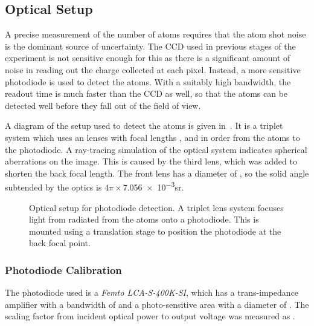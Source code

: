 \subsection{Optical Setup}\label{subsec:optical_setup}
A precise measurement of the number of atoms requires that the atom shot noise
is the dominant source of uncertainty. The CCD used in
previous stages of the experiment is not sensitive enough for this as there is a
significant amount of noise in reading out the charge collected at each pixel.
Instead, a more sensitive photodiode is used to detect the atoms. With a
suitably high bandwidth, the readout time is much faster than the CCD as well,
so that the atoms can be detected well before they fall out of the field of
view. \par\noindent A diagram of the setup used to detect the atoms is given
in~. It is a triplet system which uses an
lenses with focal lengths ,
 and  in order from the
atoms to the photodiode.  A ray-tracing simulation of the optical
system indicates spherical aberrations on the image. This is caused by
the third lens, which was added to shorten the back focal length. The
front lens has a diameter of
, so the solid angle subtended by the
optics is \(4\pi \times\)\num{7.056e-3}\si{\steradian}.
\begin{figure}[!htbp] 
  \centering \fontsize{18pt}{18pt}
	\resizebox{0.7\textwidth}{!}{}
	\caption[Optical setup for Photodiode Detection]{Optical setup for photodiode
		detection. A triplet lens system focuses light from radiated from the atoms
		onto a photodiode. This is mounted using a translation stage to
  position the photodiode at the back focal point.}
  \label{fig:photodiode_optics}
\end{figure}

\subsubsection{Photodiode Calibration}
The photodiode used is a \textit{Femto LCA-S-400K-SI},
which has a trans-impedance amplifier with a bandwidth of  and a photo-sensitive area
with a diameter of . The scaling factor from
incident optical power to output voltage was measured as . 
